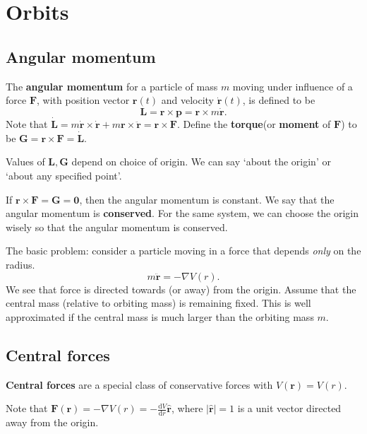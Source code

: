 \section{Orbits}
\subsection{Angular momentum}
\begin{definition}
    The \textbf{angular momentum} for a particle of mass $m$ moving under influence of a force $ \mathbf{F} $, with position vector $\mathbf{r}(t)$ and velocity $ \dot{\mathbf{r}}(t) $, is defined to be 
    \[
        \mathbf{L} = \mathbf{r} \times \mathbf{p} = \mathbf{r} \times m \dot{\mathbf{r}}.
    \]
    Note that $ \dot{\mathbf{L}} = m \dot{\mathbf{r}}\times \dot{\mathbf{r}}+m\mathbf{r} \times \ddot{\mathbf{r}} = \mathbf{r} \times \mathbf{F} $. Define the \textbf{torque}(or \textbf{moment} of $\mathbf{F}$) to be $ \mathbf{G} = \mathbf{r} \times \mathbf{F} = \dot{\mathbf{L}} $.
\end{definition}
\begin{note}
    Values of $ \mathbf{L},\mathbf{G} $ depend on choice of origin. We can say `about the origin' or `about any specified point'.
\end{note}
\begin{note}
    If $ \mathbf{r} \times \mathbf{F} =\mathbf{G}= \mathbf{0} $, then the angular momentum is constant. We say that the angular momentum is \textbf{conserved}. For the same system, we can choose the origin wisely so that the angular momentum is conserved.
\end{note}

The basic problem: consider a particle moving in a force that depends \textit{only} on the radius.
\[
    m \ddot{\mathbf{r}} = - \nabla V(r).
\]
We see that force is directed towards (or away) from the origin. Assume that the central mass (relative to orbiting mass) is remaining fixed. This is well approximated if the central mass is much larger than the orbiting mass $m$.

\subsection{Central forces}
\begin{definition}
    \textbf{Central forces} are a special class of conservative forces with $ V(\mathbf{r}) = V(r) $. 
\end{definition}
Note that $ \mathbf{F}(\mathbf{r}) = - \nabla V(r) = -\frac{\mathrm{d}V}{\mathrm{d}r}\hat{\mathbf{r}}  $, where $ |\hat{\mathbf{r}}|=1 $ is a unit vector directed away from the origin.
\begin{center}
\end{center}

